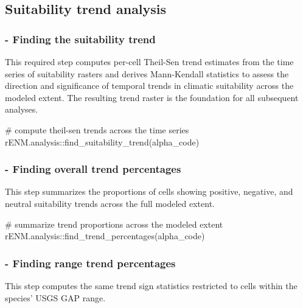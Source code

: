 \documentclass[
  letterpaper,
  DIV=11,
  numbers=noendperiod]{scrartcl}
\newenvironment{Shaded}{\begin{snugshade}}{\end{snugshade}}
\newcommand{\CommentTok}[1]{\textcolor[rgb]{0.37,0.37,0.37}{#1}}
\newcommand{\FunctionTok}[1]{\textcolor[rgb]{0.28,0.35,0.67}{#1}}
\newcommand{\NormalTok}[1]{\textcolor[rgb]{0.00,0.23,0.31}{#1}}
\newcommand{\SpecialCharTok}[1]{\textcolor[rgb]{0.37,0.37,0.37}{#1}}
\begin{document}
\subsection{Suitability trend
analysis}\label{suitability-trend-analysis}

\subsubsection{- Finding the suitability
trend}\label{finding-the-suitability-trend}

This required step computes per-cell Theil-Sen trend estimates from the
time series of suitability rasters and derives Mann-Kendall statistics
to assess the direction and significance of temporal trends in climatic
suitability across the modeled extent. The resulting trend raster is the
foundation for all subsequent analyses.

\begin{Shaded}
\begin{Highlighting}[]
\CommentTok{\# compute theil{-}sen trends across the time series}
\NormalTok{rENM.analysis}\SpecialCharTok{::}\FunctionTok{find\_suitability\_trend}\NormalTok{(alpha\_code)}
\end{Highlighting}
\end{Shaded}

\subsubsection{- Finding overall trend
percentages}\label{finding-overall-trend-percentages}

This step summarizes the proportions of cells showing positive,
negative, and neutral suitability trends across the full modeled extent.

\begin{Shaded}
\begin{Highlighting}[]
\CommentTok{\# summarize trend proportions across the modeled extent}
\NormalTok{rENM.analysis}\SpecialCharTok{::}\FunctionTok{find\_trend\_percentages}\NormalTok{(alpha\_code)}
\end{Highlighting}
\end{Shaded}

\subsubsection{- Finding range trend
percentages}\label{finding-range-trend-percentages}

This step computes the same trend sign statistics restricted to cells
within the species' USGS GAP range.
\end{document}
